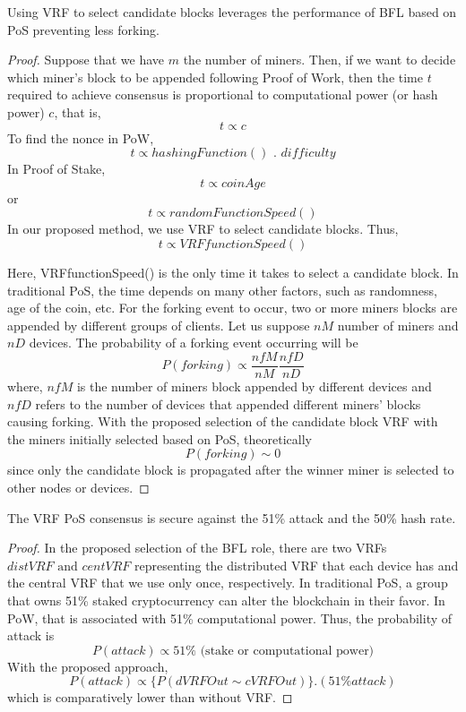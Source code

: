 \documentclass[lettersize,journal]{IEEEtran}
\begin{document}
\begin{prop}
Using VRF to select candidate blocks leverages the performance of BFL based on PoS preventing less forking.
\end{prop}
\begin{proof}
Suppose that we have $m$ the number of miners. 
Then, if we want to decide which miner's block to be appended following Proof of Work, then the time $t$ required to achieve consensus is proportional to computational power (or hash power) $c$, that is,
$$t \propto c$$
To find the nonce in PoW, 
$$ t \propto hashingFunction() \text{ . } difficulty$$
In Proof of Stake, 
$$t \propto coinAge$$ or $$t \propto randomFunctionSpeed()$$
In our proposed method, we use VRF to select candidate blocks. 
Thus, 
$$t \propto VRFfunctionSpeed()$$

Here, VRFfunctionSpeed() is the only time it takes to select a candidate block.
In traditional PoS, the time depends on many other factors, such as randomness, age of the coin, etc. For the forking event to occur, two or more miners blocks are appended by different groups of clients.
Let us suppose $nM$ number of miners and $nD$ devices.
The probability of a forking event occurring will be $$ P(forking) \propto \frac{nfM}{nM} \frac{nfD}{nD}$$ where, 
$nfM$ is the number of miners block appended by different devices and
$nfD$ refers to the number of devices that appended different miners' blocks causing forking.
With the proposed selection of the candidate block VRF with the miners initially selected based on PoS, theoretically
$$P(forking) \sim 0$$ since only the candidate block is propagated after the winner miner is selected to other nodes or devices.
\end{proof}


\begin{prop}
The VRF PoS consensus is secure against the 51\% attack and the 50\% hash rate.
\end{prop}
\begin{proof}
In the proposed selection of the BFL role, there are two VRFs $distVRF \text{ and } centVRF$ representing the
distributed VRF that each device has and the central VRF that we use only once, respectively.
In traditional PoS, a group that owns 51\% staked cryptocurrency can alter the blockchain in their favor.
In PoW, that is associated with 51\% computational power.
Thus, the probability of attack is $$ P (attack) \propto 51\% \text{ (stake or computational power)}$$
With the proposed approach, 
$$P(attack) \propto \{ P(dVRFOut \sim cVRFOut) \} . (51\% attack)$$ which 
is comparatively lower than without VRF.
\end{proof}
\end{document}
